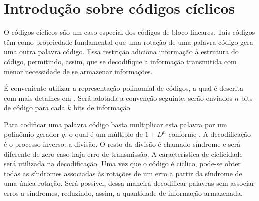 \section{Introdução sobre códigos cíclicos}
O códigos cíclicos são um caso especial dos códigos de bloco lineares. Tais códigos têm como propriedade fundamental que uma rotação de uma palavra código gera uma outra palavra código. Essa restrição adiciona informação à estrutura do código, permitindo, assim, que se decodifique a informação transmitida com menor necessidade de se armazenar informações.

É conveniente utilizar a representação polinomial de códigos, a qual é descrita com mais detalhes em \cite{ref:roteiro}. Será adotada a convenção seguinte: serão enviados $n$ bits de código para cada $k$ bits de informação.

Para codificar uma palavra código basta multiplicar esta palavra por um polinômio gerador $g$, o qual é um múltiplo de $1+D^n$ conforme \cite{ref:roteiro}. A decodificação é o processo inverso: a divisão. O resto da divisão é chamado síndrome e será diferente de zero caso haja erro de transmissão. A característica de ciclicidade será utilizada na decodificação. Uma vez que o código é cíclico, pode-se obter todas as síndromes associadas às rotações de um erro a partir da síndrome de uma única rotação. Será possível, dessa maneira decodificar palavras sem associar erros a síndromes, reduzindo, assim, a quantidade de informação armazenada.